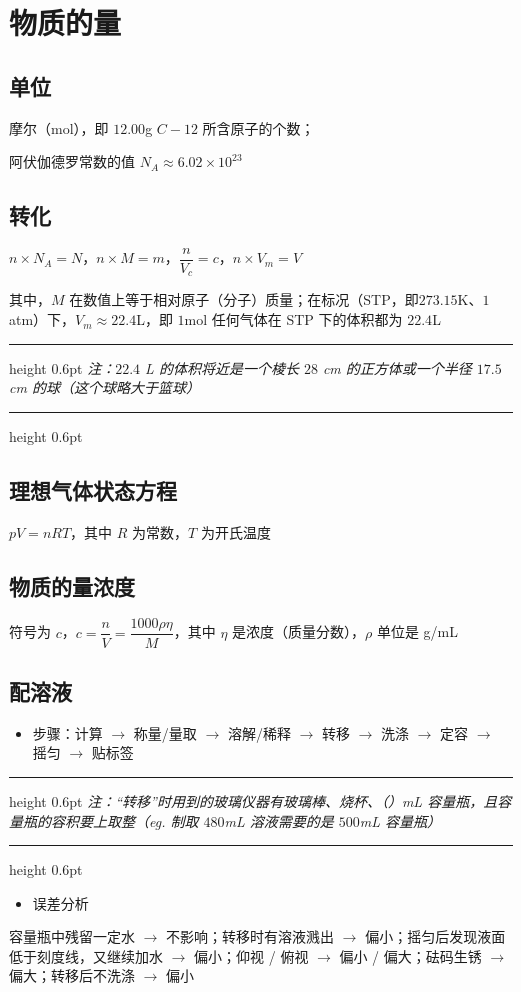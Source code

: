 \documentclass[UTF8,zihao=-4,openany]{ctexbook}
\newenvironment{notebox}
  {\par\smallskip\noindent\begingroup\begin{minipage}{\linewidth}\color{noteframe}\hrule height 0.6pt\smallskip\color{black}\itshape}
  {\par\smallskip\color{noteframe}\hrule height 0.6pt\end{minipage}\endgroup\par\smallskip}
\begin{document}
\section{物质的量}
\subsection{单位}
摩尔（mol），即 $12.00$g $C-12$ 所含原子的个数；\par

阿伏伽德罗常数的值 $N_A\approx 6.02\times10^{23} $\par
\subsection{转化}
$n\times N_A=N$，$n\times M=m$，$\dfrac{n}{V_c}=c$，$n\times V_m=V$\par

其中，$M$ 在数值上等于相对原子（分子）质量；在标况（STP，即$273.15$K、$1$atm）下，$V_m\approx 22.4$L，即 $1$mol 任何气体在 STP 下的体积都为 $22.4$L\par
\begin{notebox}
注：$22.4$ L 的体积将近是一个棱长 $28$ cm 的正方体或一个半径 $17.5$ cm 的球（这个球略大于篮球）\par
\end{notebox}
\subsection{理想气体状态方程}
$pV=nRT$，其中 $R$ 为常数，$T$ 为开氏温度\par

\subsection{物质的量浓度}
符号为 $c$，$c=\dfrac{n}{V}=\dfrac{1000\rho\eta}{M}$，其中 $\eta$ 是浓度（质量分数），$\rho$ 单位是 g/mL\par
\subsection{配溶液}
\begin{itemize}
\item 步骤：计算 $\to$ 称量/量取 $\to$ 溶解/稀释 $\to$ 转移 $\to$ 洗涤 $\to$ 定容 $\to$ 摇匀 $\to$ 贴标签
\end{itemize}
\begin{notebox}
注：“转移”时用到的玻璃仪器有玻璃棒、烧杯、（）mL 容量瓶，且容量瓶的容积要上取整（eg. 制取 $480$mL 溶液需要的是 $500$mL 容量瓶）\par
\end{notebox}
\begin{itemize}
\item 误差分析
\end{itemize}
容量瓶中残留一定水 $\to$ 不影响；转移时有溶液溅出 $\to$ 偏小；摇匀后发现液面低于刻度线，又继续加水 $\to$ 偏小；仰视 / 俯视 $\to$ 偏小 / 偏大；砝码生锈 $\to$ 偏大；转移后不洗涤 $\to$ 偏小\par
\end{document}
